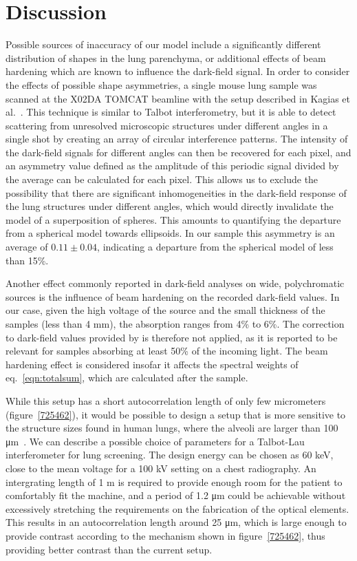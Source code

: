 \documentclass[preprint,12pt]{elsarticle}
\begin{document}
\section*{Discussion}
Possible sources of inaccuracy of our model include a significantly
different distribution of shapes in the lung parenchyma, or additional
effects of beam hardening which are known to influence the dark-field
signal. In order to consider the effects of possible shape asymmetries, a
single mouse lung sample was scanned at the X02DA TOMCAT beamline with the
setup described in Kagias et al.~\cite{PhysRevLett.116.093902}. This
technique is similar to Talbot interferometry, but it is able to detect
scattering from unresolved microscopic structures under different angles in
a single shot by
creating an array of circular interference patterns. The intensity of the
dark-field signals for different angles can then be recovered for each
pixel, and an asymmetry value defined as the amplitude of this periodic
signal divided by the average can be calculated for each pixel. This allows
us to exclude the possibility that there are significant inhomogeneities in
the dark-field response of the lung structures under different angles, which
would directly invalidate the model of a superposition of spheres. This
amounts to quantifying the departure from a spherical model towards
ellipsoids. In our sample this asymmetry is an average of $0.11 \pm 0.04$, indicating a departure from the spherical model of less than 15\%.

Another effect commonly reported in dark-field analyses on wide, polychromatic
sources is the influence of beam hardening on the recorded dark-field
values. In our case, given the high voltage of the source and the small
thickness of the samples (less than 4 mm), the absorption ranges from 4\% to
6\%. The correction to dark-field values provided by is therefore
not applied, as it is reported to be relevant for samples absorbing at least
50\% of the incoming light. The beam hardening effect is considered insofar
it affects the spectral weights of eq.~\ref{eqn:totalsum}, which are calculated
after the sample.

While this setup has a short autocorrelation length of only few micrometers
(figure~\ref{725462}), it would be possible to design a setup that is more
sensitive to the structure sizes found in human lungs, where the alveoli are
larger than
100 μm~\cite{Ochs_2004}. We can describe a
possible choice of parameters for a Talbot-Lau interferometer for lung
screening. The design energy can be chosen as 60 keV, close to
the mean voltage for a 100 kV setting on a chest
radiography. An intergrating length of 1 m is required to provide
enough room for the patient to comfortably fit the machine,
and a period of 1.2 μm could be achievable without
excessively stretching the requirements on the fabrication of the optical
elements. This results in an autocorrelation length around
25 μm, which is large enough to provide contrast according
to the mechanism shown in figure~\ref{725462}, thus providing better contrast than the
current setup.
\end{document}
